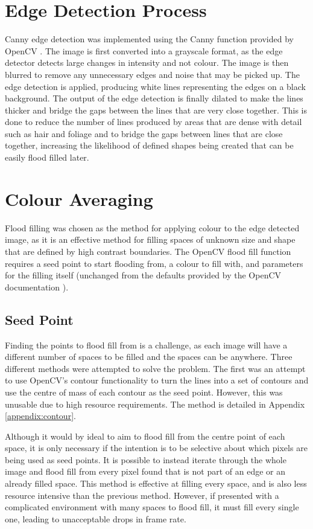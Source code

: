 \section{Edge Detection Process}

Canny edge detection was implemented using the Canny function provided by OpenCV \cite{OpenCV}. The image is first converted into a grayscale format, as the edge detector detects large changes in intensity and not colour. The image is then blurred to remove any unnecessary edges and noise that may be picked up. The edge detection is applied, producing white lines representing the edges on a black background. The output of the edge detection is finally dilated to make the lines thicker and bridge the gaps between the lines that are very close together. This is done to reduce the number of lines produced by areas that are dense with detail such as hair and foliage and to bridge the gaps between lines that are close together, increasing the likelihood of defined shapes being created that can be easily flood filled later.

\section{Colour Averaging}

Flood filling was chosen as the method for applying colour to the edge detected image, as it is an effective method for filling spaces of unknown size and shape that are defined by high contrast boundaries. The OpenCV flood fill function requires a seed point to start flooding from, a colour to fill with, and parameters for the filling itself (unchanged from the defaults provided by the OpenCV documentation \cite{opencvffilldemo}).

\subsection{Seed Point}

Finding the points to flood fill from is a challenge, as each image will have a different number of spaces to be filled and the spaces can be anywhere. Three different methods were attempted to solve the problem. The first was an attempt to use OpenCV's contour functionality to turn the lines into a set of contours and use the centre of mass of each contour as the seed point. However, this was unusable due to high resource requirements. The method is detailed in Appendix \ref{appendix:contour}.

Although it would by ideal to aim to flood fill from the centre point of each space, it is only necessary if the intention is to be selective about which pixels are being used as seed points. It is possible to instead iterate through the whole image and flood fill from every pixel found that is not part of an edge or an already filled space. This method is effective at filling every space, and is also less resource intensive than the previous method. However, if presented with a complicated environment with many spaces to flood fill, it must fill every single one, leading to unacceptable drops in frame rate.

